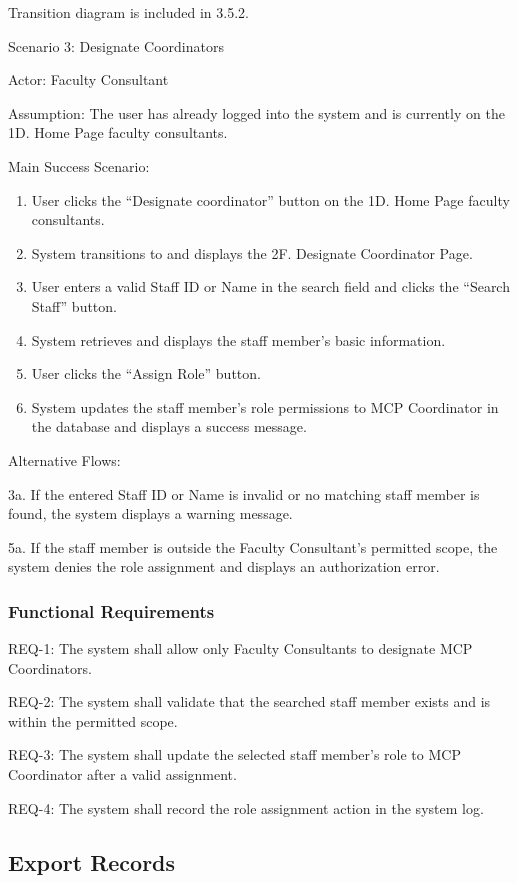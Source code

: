 Transition diagram is included in 3.5.2.

Scenario 3: Designate Coordinators

Actor: Faculty Consultant

Assumption: The user has already logged into the system and is currently on the 1D. Home Page faculty consultants.

Main Success Scenario:
\begin{enumerate}
\item User clicks the ``Designate coordinator'' button on the 1D. Home Page faculty consultants.
\item System transitions to and displays the 2F. Designate Coordinator Page.
\item User enters a valid Staff ID or Name in the search field and clicks the ``Search Staff'' button.
\item System retrieves and displays the staff member's basic information.
\item User clicks the ``Assign Role'' button.
\item System updates the staff member's role permissions to MCP Coordinator in the database and displays a success message.
\end{enumerate}

Alternative Flows:

3a. If the entered Staff ID or Name is invalid or no matching staff member is found, the system displays a warning message.

5a. If the staff member is outside the Faculty Consultant's permitted scope, the system denies the role assignment and displays an authorization error.

\subsubsection{Functional Requirements}

REQ-1: The system shall allow only Faculty Consultants to designate MCP Coordinators.

REQ-2: The system shall validate that the searched staff member exists and is within the permitted scope.

REQ-3: The system shall update the selected staff member's role to MCP Coordinator after a valid assignment.

REQ-4: The system shall record the role assignment action in the system log.

\subsection{Export Records}

